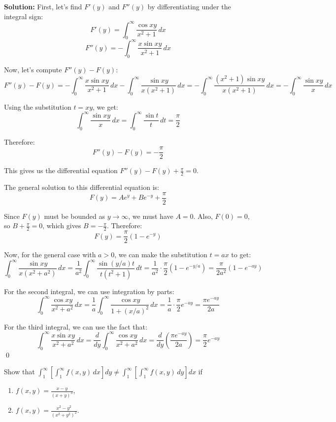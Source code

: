 \bigskip\noindent\textbf{Solution:}
First, let's find $F'(y)$ and $F''(y)$ by differentiating under the integral sign:
\[F'(y) = \int_{0}^{\infty} \frac{\cos xy}{x^2 + 1} \, dx\]
\[F''(y) = -\int_{0}^{\infty} \frac{x \sin xy}{x^2 + 1} \, dx\]

Now, let's compute $F''(y) - F(y)$:
\[F''(y) - F(y) = -\int_{0}^{\infty} \frac{x \sin xy}{x^2 + 1} \, dx - \int_{0}^{\infty} \frac{\sin xy}{x(x^2 + 1)} \, dx = -\int_{0}^{\infty} \frac{(x^2 + 1) \sin xy}{x(x^2 + 1)} \, dx = -\int_{0}^{\infty} \frac{\sin xy}{x} \, dx\]

Using the substitution $t = xy$, we get:
\[\int_{0}^{\infty} \frac{\sin xy}{x} \, dx = \int_{0}^{\infty} \frac{\sin t}{t} \, dt = \frac{\pi}{2}\]

Therefore:
\[F''(y) - F(y) = -\frac{\pi}{2}\]

This gives us the differential equation $F''(y) - F(y) + \frac{\pi}{2} = 0$.

The general solution to this differential equation is:
\[F(y) = A e^y + B e^{-y} + \frac{\pi}{2}\]

Since $F(y)$ must be bounded as $y \to \infty$, we must have $A = 0$. Also, $F(0) = 0$, so $B + \frac{\pi}{2} = 0$, which gives $B = -\frac{\pi}{2}$. Therefore:
\[F(y) = \frac{\pi}{2} (1 - e^{-y})\]

Now, for the general case with $a > 0$, we can make the substitution $t = ax$ to get:
\[\int_{0}^{\infty} \frac{\sin xy}{x(x^2 + a^2)} \, dx = \frac{1}{a^2} \int_{0}^{\infty} \frac{\sin (y/a)t}{t(t^2 + 1)} \, dt = \frac{1}{a^2} \cdot \frac{\pi}{2} (1 - e^{-y/a}) = \frac{\pi}{2a^2} (1 - e^{-ay})\]

For the second integral, we can use integration by parts:
\[\int_{0}^{\infty} \frac{\cos xy}{x^2 + a^2} \, dx = \frac{1}{a} \int_{0}^{\infty} \frac{\cos xy}{1 + (x/a)^2} \, dx = \frac{1}{a} \cdot \frac{\pi}{2} e^{-ay} = \frac{\pi e^{-ay}}{2a}\]

For the third integral, we can use the fact that:
\[\int_{0}^{\infty} \frac{x \sin xy}{x^2 + a^2} \, dx = \frac{d}{dy} \int_{0}^{\infty} \frac{\cos xy}{x^2 + a^2} \, dx = \frac{d}{dy} \left(\frac{\pi e^{-ay}}{2a}\right) = \frac{\pi}{2} e^{-ay}\]\qed


\begin{problembox}
Show that $\int_{1}^{\infty} \left[ \int_{1}^{\infty} f(x, y) \, dx \right] dy \neq \int_{1}^{\infty} \left[ \int_{1}^{\infty} f(x, y) \, dy \right] dx$ if
\begin{enumerate}[label=(\alph*)]
    \item $f(x, y) = \frac{x - y}{(x + y)^3}$,
    \item $f(x, y) = \frac{x^2 - y^2}{(x^2 + y^2)^2}.$
\end{enumerate}
\end{problembox}

